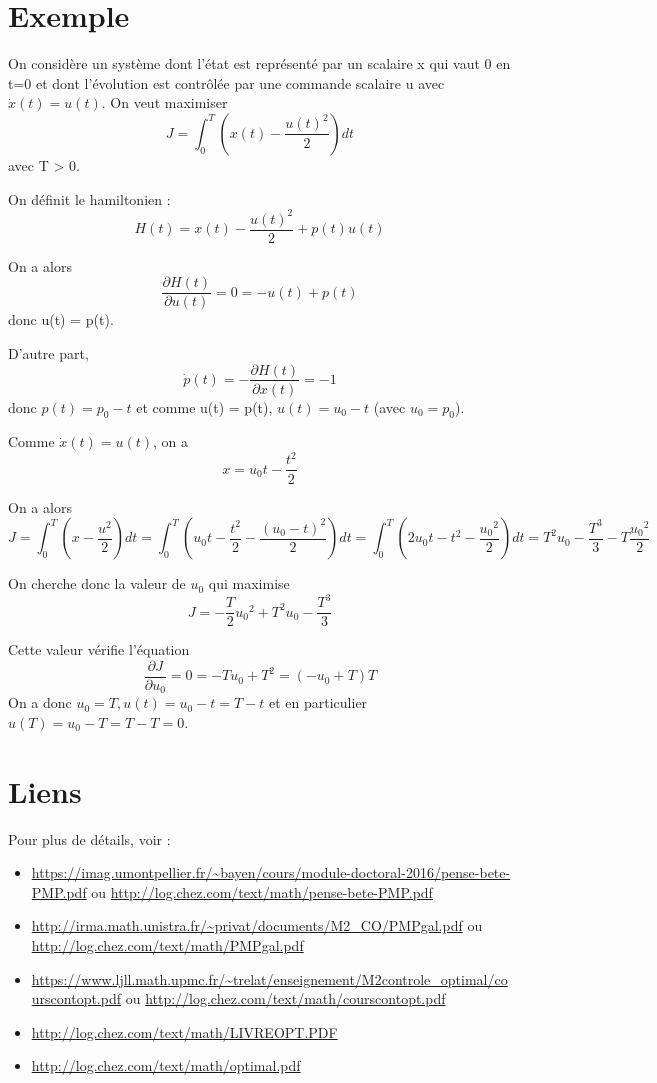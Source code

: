 \documentclass[10pt]{article}
\begin{document}
\section{Exemple}

On considère un système dont l'état est représenté par un scalaire x qui vaut 0 en t=0 et dont l'évolution est contrôlée par une commande scalaire u avec \( \dot{x}(t) = u(t) \). On veut maximiser 
\[ J = \int_0^T (x(t) - \frac{u(t)^2}{2}) dt \]
avec T > 0.

On définit le hamiltonien :
\[ H(t) = x(t) - \frac{u(t)^2}{2} + p(t) u(t) \]

On a alors 
\[ \frac{\partial H(t)}{\partial u(t)} = 0 = - u(t) + p(t) \]
donc u(t) = p(t).

D'autre part,
\[ \dot{p}(t) = - \frac{\partial H(t)}{\partial x(t)} = -1 \]
donc \( p(t) = p_0 - t \) et comme u(t) = p(t), \( u(t) = u_0 - t \) (avec \( u_0 = p_0 \)).

Comme \( \dot{x}(t) = u(t) \), on a
\[ x = u_0 t - \frac{t^2}{2} \]

On a alors
\[ J = \int_0^T (x - \frac{u^2}{2}) dt = \int_0^T (u_0 t - \frac{t^2}{2} - \frac{(u_0 - t)^2}{2}) dt = \int_0^T (2 u_0 t - t^2 - \frac{{u_0}^2}{2}) dt = T^2 u_0 - \frac{T^3}{3} - T \frac{{u_0}^2}{2} \]

On cherche donc la valeur de \( u_0 \) qui maximise
\[ J = - \frac{T}{2} {u_0}^2 + T^2 u_0 - \frac{T^3}{3} \]

Cette valeur vérifie l'équation 
\[ \frac{\partial J}{\partial u_0} = 0 = - T u_0 + T^2 = (- u_0 + T) T \]
On a donc \( u_0 = T, u(t) = u_0 - t = T - t \) et en particulier \( u(T) = u_0 - T = T - T = 0 \). 


\section{Liens}

Pour plus de détails, voir :
\begin{itemize}
     \setlength{\itemsep}{1pt}
     \setlength{\parskip}{0pt}
     \setlength{\parsep}{0pt}
\item \url{https://imag.umontpellier.fr/~bayen/cours/module-doctoral-2016/pense-bete-PMP.pdf} ou \url{http://log.chez.com/text/math/pense-bete-PMP.pdf}
\item \url{http://irma.math.unistra.fr/~privat/documents/M2_CO/PMPgal.pdf} ou \url{http://log.chez.com/text/math/PMPgal.pdf}
\item \url{https://www.ljll.math.upmc.fr/~trelat/enseignement/M2controle_optimal/courscontopt.pdf} ou \url {http://log.chez.com/text/math/courscontopt.pdf}
\item \url{http://log.chez.com/text/math/LIVREOPT.PDF}
\item \url{http://log.chez.com/text/math/optimal.pdf}
\end{itemize}
\end{document}
